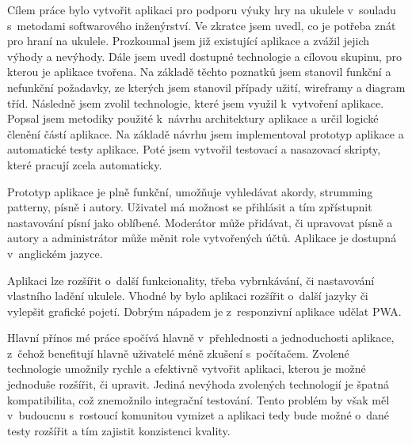 \begin{conclusion}
    Cílem práce bylo vytvořit aplikaci pro podporu výuky hry na ukulele v~souladu s~metodami softwarového inženýrství. Ve zkratce jsem uvedl, co je potřeba znát pro hraní na ukulele. Prozkoumal jsem již existující aplikace a zvážil jejich výhody a nevýhody. Dále jsem uvedl dostupné technologie a cílovou skupinu, pro kterou je aplikace tvořena. Na základě těchto poznatků jsem stanovil funkční a nefunkční požadavky, ze kterých jsem stanovil případy užití, wireframy a diagram tříd. Následně jsem zvolil technologie, které jsem využil k~vytvoření aplikace. Popsal jsem metodiky použité k~návrhu architektury aplikace a určil logické členění částí aplikace. Na základě návrhu jsem implementoval prototyp aplikace a automatické testy aplikace. Poté jsem vytvořil testovací a nasazovací skripty, které pracují zcela automaticky.

    Prototyp aplikace je plně funkční, umožňuje vyhledávat akordy, strumming patterny, písně i autory. Uživatel má možnost se přihlásit a tím zpřístupnit nastavování písní jako oblíbené. Moderátor může přidávat, či upravovat písně a autory a administrátor může měnit role vytvořených účtů. Aplikace je dostupná v~anglickém jazyce.

    Aplikaci lze rozšířit o~další funkcionality, třeba vybrnkávání, či nastavování vlastního ladění ukulele. Vhodné by bylo aplikaci rozšířit o~další jazyky či vylepšit grafické pojetí. Dobrým nápadem je z~responzivní aplikace udělat PWA.

    Hlavní přínos mé práce spočívá hlavně v~přehlednosti a jednoduchosti aplikace, z~čehož benefitují hlavně uživatelé méně zkušení s~počítačem. Zvolené technologie umožnily rychle a efektivně vytvořit aplikaci, kterou je možné jednoduše rozšířit, či upravit. Jediná nevýhoda zvolených technologií je špatná kompatibilita, což znemožnilo integrační testování. Tento problém by však měl v~budoucnu s~rostoucí komunitou vymizet a aplikaci tedy bude možné o~dané testy rozšířit a tím zajistit konzistenci kvality.
\end{conclusion}